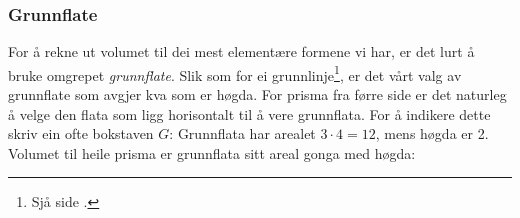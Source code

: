 \subsubsection{Grunnflate}
For å rekne ut volumet til dei mest elementære formene vi har, er det lurt å bruke omgrepet \textit{grunnflate}. Slik som for ei grunnlinje\footnote{Sjå side \pageref{grunnlinje}.}, er det vårt valg av grunnflate som avgjer kva som er høgda. For prisma fra førre side er det naturleg å velge den flata som ligg horisontalt til å vere grunnflata. For å indikere dette skriv ein ofte bokstaven $ G $:
Grunnflata har arealet $ 3\cdot4=12 $, mens høgda er 2. Volumet til heile prisma er grunnflata sitt areal gonga med høgda:




